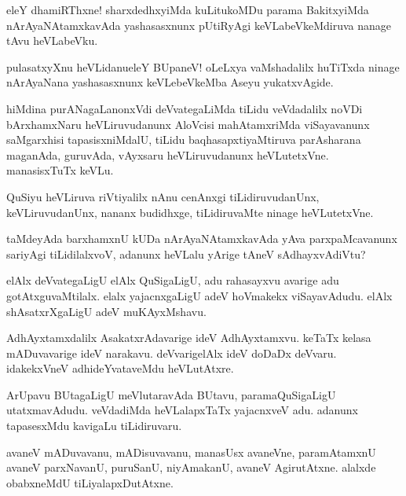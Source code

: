 \begin{mng}
eleY dhamiRThxne! sharxdedhxyiMda kuLitukoMDu parama BakitxyiMda nArAyaNAtamxkavAda yashasasxnunx pUtiRyAgi keVLabeVkeMdiruva nanage tAvu heVLabeVku.
\end{mng}

\begin{mng}
pulasatxyXnu heVLidanu\mdash eleY BUpaneV! oLeLxya vaMshadalilx huTiTxda ninage nArAyaNana yashasasxnunx keVLebeVkeMba Aseyu yukatxvAgide.
\end{mng}

\begin{mng}
hiMdina purANagaLanonxVdi deVvategaLiMda tiLidu veVdadalilx noVDi bArxhamxNaru heVLiruvudanunx AloVcisi mahAtamxriMda viSayavanunx saMgarxhisi tapasisxniMdalU, tiLidu baqhasapxtiyaMtiruva parAsharana maganAda, guruvAda, vAyxsaru heVLiruvudanunx heVLutetxVne. manasisxTuTx keVLu. 
\end{mng}

\begin{mng}
QuSiyu heVLiruva riVtiyalilx nAnu cenAnxgi tiLidiruvudanUnx, keVLiruvudanUnx, nananx budidhxge, tiLidiruvaMte ninage heVLutetxVne.
\end{mng}

\begin{mng}
taMdeyAda barxhamxnU kUDa nArAyaNAtamxkavAda yAva parxpaMcavanunx sariyAgi tiLidilalxvoV, adanunx heVLalu yArige tAneV sAdhayxvAdiVtu?
\end{mng}

\begin{mng}
elAlx deVvategaLigU elAlx QuSigaLigU, adu rahasayxvu avarige adu gotAtxguvaMtilalx. elalx yajacnxgaLigU adeV hoVmakekx viSayavAdudu. elAlx shAsatxrXgaLigU adeV muKAyxMshavu.
\end{mng}

\begin{mng}
AdhAyxtamxdalilx AsakatxrAdavarige ideV AdhAyxtamxvu. keTaTx kelasa mADuvavarige ideV narakavu. deVvarigelAlx ideV doDaDx deVvaru. idakekxVneV adhideYvataveMdu heVLutAtxre.
\end{mng}

\begin{mng}
ArUpavu BUtagaLigU meVlutaravAda BUtavu, paramaQuSigaLigU utatxmavAdudu. veVdadiMda heVLalapxTaTx yajacnxveV adu. adanunx tapasesxMdu kavigaLu tiLidiruvaru.
\end{mng}

\begin{mng}
avaneV mADuvavanu, mADisuvavanu, manasUsx avaneVne, paramAtamxnU avaneV parxNavanU, puruSanU, niyAmakanU, avaneV AgirutAtxne. alalxde obabxneMdU tiLiyalapxDutAtxne.
\end{mng}

